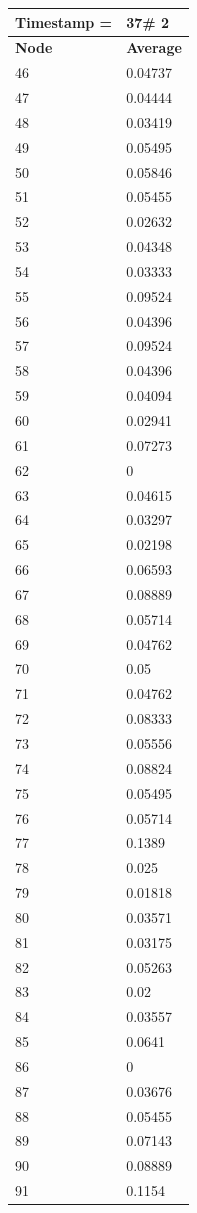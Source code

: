 \begin{tabular}{|l||l|}
\hline
\textbf{Timestamp =} & \textbf{37}\# 2\\\hline
	\textbf{Node} & \textbf{Average} \\ \hline
\hline
	46 & 0.04737 \\ \hline
	47 & 0.04444 \\ \hline
	48 & 0.03419 \\ \hline
	49 & 0.05495 \\ \hline
	50 & 0.05846 \\ \hline
	51 & 0.05455 \\ \hline
	52 & 0.02632 \\ \hline
	53 & 0.04348 \\ \hline
	54 & 0.03333 \\ \hline
	55 & 0.09524 \\ \hline
	56 & 0.04396 \\ \hline
	57 & 0.09524 \\ \hline
	58 & 0.04396 \\ \hline
	59 & 0.04094 \\ \hline
	60 & 0.02941 \\ \hline
	61 & 0.07273 \\ \hline
	62 & 0 \\ \hline
	63 & 0.04615 \\ \hline
	64 & 0.03297 \\ \hline
	65 & 0.02198 \\ \hline
	66 & 0.06593 \\ \hline
	67 & 0.08889 \\ \hline
	68 & 0.05714 \\ \hline
	69 & 0.04762 \\ \hline
	70 & 0.05 \\ \hline
	71 & 0.04762 \\ \hline
	72 & 0.08333 \\ \hline
	73 & 0.05556 \\ \hline
	74 & 0.08824 \\ \hline
	75 & 0.05495 \\ \hline
	76 & 0.05714 \\ \hline
	77 & 0.1389 \\ \hline
	78 & 0.025 \\ \hline
	79 & 0.01818 \\ \hline
	80 & 0.03571 \\ \hline
	81 & 0.03175 \\ \hline
	82 & 0.05263 \\ \hline
	83 & 0.02 \\ \hline
	84 & 0.03557 \\ \hline
	85 & 0.0641 \\ \hline
	86 & 0 \\ \hline
	87 & 0.03676 \\ \hline
	88 & 0.05455 \\ \hline
	89 & 0.07143 \\ \hline
	90 & 0.08889 \\ \hline
	91 & 0.1154 \\ \hline
\end{tabular}
